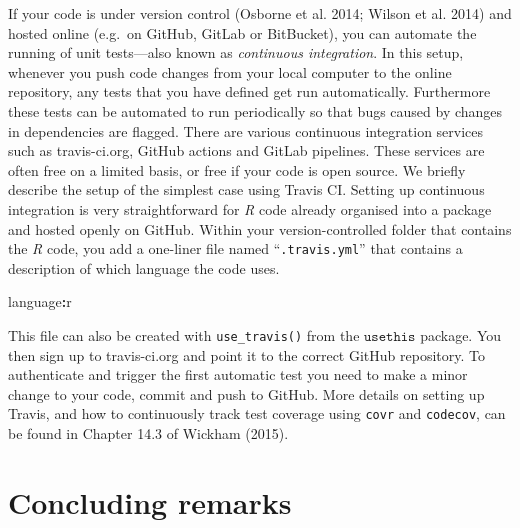 \documentclass[]{elsarticle} %
\newenvironment{Shaded}{\begin{snugshade}}{\end{snugshade}}
\newcommand{\NormalTok}[1]{#1}
\newcommand{\OperatorTok}[1]{\textcolor[rgb]{0.81,0.36,0.00}{\textbf{#1}}}
\begin{document}
If your code is under version control (Osborne et al. 2014; Wilson et al. 2014) and hosted online (e.g.~on GitHub, GitLab or BitBucket), you can automate the running of unit tests---also known as \emph{continuous integration}.
In this setup, whenever you push code changes from your local computer to the online repository, any tests that you have defined get run automatically.
Furthermore these tests can be automated to run periodically so that bugs caused by changes in dependencies are flagged.
There are various continuous integration services such as travis-ci.org, GitHub actions and GitLab pipelines.
These services are often free on a limited basis, or free if your code is open source.
\newline
\newline
We briefly describe the setup of the simplest case using Travis CI.
Setting up continuous integration is very straightforward for \emph{R} code already organised into a package and hosted openly on GitHub.
Within your version-controlled folder that contains the \emph{R} code, you add a one-liner file named ``\texttt{.travis.yml}'' that contains a description of which language the code uses.
\newline
{}\label{travis}

\begin{Shaded}
\begin{Highlighting}[]
\NormalTok{language}\OperatorTok{:}\NormalTok{r}
\end{Highlighting}
\end{Shaded}

This file can also be created with \texttt{use\_travis()} from the \(\texttt{usethis}\) package.
You then sign up to travis-ci.org and point it to the correct GitHub repository.
To authenticate and trigger the first automatic test you need to make a minor change to your code, commit and push to GitHub.
More details on setting up Travis, and how to continuously track test coverage using \texttt{covr} and \texttt{codecov}, can be found in Chapter 14.3 of Wickham (2015).

\hypertarget{concluding-remarks}{%
\section{Concluding remarks}\label{concluding-remarks}}
\end{document}
